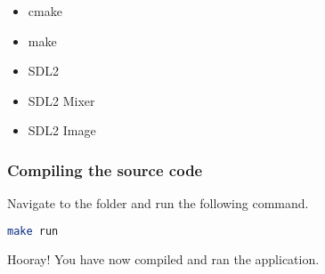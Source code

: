 \begin{itemize}
    \item cmake
    \item make
    \item SDL2
    \item SDL2 Mixer
    \item SDL2 Image
\end{itemize}

\subsubsection{Compiling the source code}
Navigate to the  folder and run the 
following command.

\begin{lstlisting}[language=bash]
make run
\end{lstlisting}

Hooray! You have now compiled and ran the application.
